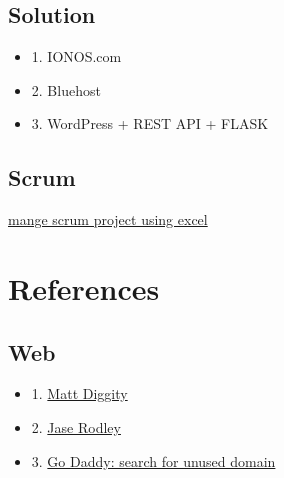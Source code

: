 \documentclass[12pt]{article}
\begin{document}
\subsection{Solution}
\begin{itemize}
    \item 1. IONOS.com
    \item 2. Bluehost
    \item 3. WordPress + REST API + FLASK
\end{itemize}

\subsection{Scrum}
\href{https://create.microsoft.com/en-us/learn/articles/four-tips-to-track-projects-in-excel}{mange scrum project using excel}

\section{References}
\subsection{Web}
\begin{itemize}
    \item 1. \href{https://www.youtube.com/watch?v=UaJIkkZbaEY}{Matt Diggity}
    \item 2. \href{https://jaserodley.com/website-flipping/}{Jase Rodley}
    \item 3. \href{https://www.godaddy.com/}{Go Daddy: search for unused domain}
\end{itemize}
    
\end{document}
